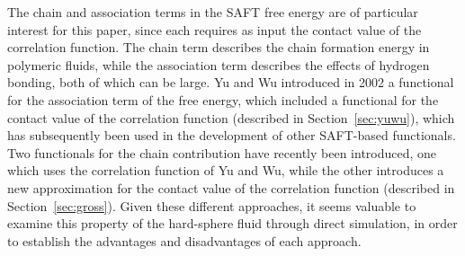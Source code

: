 \documentclass[letterpaper,twocolumn,amsmath,amssymb,jcp,10pt,aip]{revtex4-1}
\begin{document}

The chain and association terms in the SAFT free energy are of
particular interest for this paper, since each requires as input the
contact value of the correlation function.  The chain term describes
the chain formation energy in polymeric fluids, while the association
term describes the effects of hydrogen bonding, both of which can be
large.
%
Yu and Wu introduced in 2002 a functional for the association term of
the free energy, which included a functional for the contact value of
the correlation function (described in
Section~\ref{sec:yuwu})\cite{yu2002fmt-dft-inhomogeneous-associating},
which has subsequently been used in the development of other
SAFT-based functionals\cite{fu2005vapor-liquid-dft, bryk2006density}.
Two functionals for the chain contribution have recently been
introduced\cite{bryk2006density, gross2009density}, one which uses the
correlation function of Yu and Wu\cite{bryk2006density}, while the
other introduces a new approximation for the contact value of the
correlation function (described in
Section~\ref{sec:gross})\cite{gross2009density}.
Given these different approaches, it seems valuable to examine this
property of the hard-sphere fluid through direct simulation, in order
to establish the advantages and disadvantages of each approach.
\end{document}
